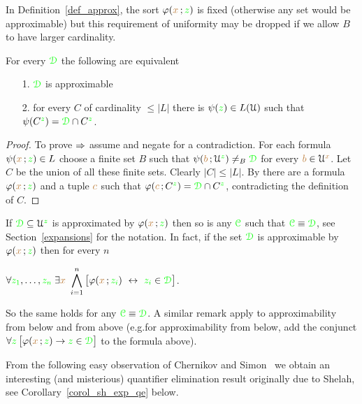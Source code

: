 In Definition~\ref{def_approx}, the sort $\varphi({\color{brown} x}\,;{\color{green} z})$ is fixed (otherwise any set would be approximable) but this requirement of uniformity may be dropped if we allow $B$ to have larger cardinality.

\begin{proposition}\label{lem_approx_nonunif}
For every ${\color{green}\EuScript D}$ the following are equivalent
\begin{itemize}
\item[1.] ${\color{green}\EuScript D}$ is approximable
\item[2.] for every $C$ of cardinality $\le|L|$ there is $\psi({\color{green} z})\in L(\EuScript U)$ such that $\psi(C^{\color{green} z})={\color{green}\EuScript D}\cap C^{\color{green} z}$.
\end{itemize}
\end{proposition}

\begin{proof}
To prove $\Rightarrow$ assume  and negate  for a contradiction.
For each formula $\psi({\color{brown} x}\,;{\color{green} z})\in L$ choose a finite set $B$ such that $\psi({\color{brown} b}\,;\EuScript U^{\color{green} z})\neq_B{\color{green}\EuScript D}$ for every ${\color{brown} b}\in\EuScript U^{\color{brown} x}$.
Let $C$ be the union of all these finite sets.
Clearly $|C|\le|L|$.
By  there are a formula $\varphi({\color{brown} x}\,;{\color{green} z})$ and a tuple ${\color{brown} c}$ such that $\varphi({\color{brown} c}\,;C^{\color{green} z})={\color{green}\EuScript D}\cap C^{\color{green} z}$, contradicting the definition of $C$.
\end{proof}

\begin{remark}\label{prop_approx_el_eq}
If ${\color{green}\EuScript D}\subseteq\EuScript U^{\color{green} z}$ is approximated by $\varphi({\color{brown} x}\,;{\color{green} z})$ then so is any ${\color{green}\EuScript C}$ such that ${\color{green}\EuScript C}\equiv{\color{green}\EuScript D}$, see Section~\ref{expansions} for the notation.
In fact, if the set ${\color{green}\EuScript D}$ is approximable by $\varphi({\color{brown} x}\,;{\color{green} z})$ then for every $n$

\hfil$\displaystyle\A {\gr z_1},\dots,{\gr z_n}\;\E {\mr x}\ \bigwedge^n_{i=1}\big[\phi({\mr x}\,;{\gr z_i})\ \iff\ {\gr z_i}\in{\gr \D}\big]$.


So the same holds for any ${\color{green}\EuScript C}\equiv{\color{green}\EuScript D}$.
A similar remark apply to approximability from below and from above (e.g.\@ for approximability from below, add the conjunct $\forall {\color{green}z}\,\big[\varphi({\color{brown} x}\,;{\color{green} z})\rightarrow {\color{green}z}\in{\color{green}\EuScript D}\big]$ to the formula above).
\end{remark}

From the following easy observation of Chernikov and Simon~\cite{CS} we obtain an interesting (and misterious) quantifier elimination result originally due to Shelah, see Corollary~\ref{corol_sh_exp_qe} below.

